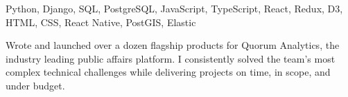 \documentclass[]{article}
\def\Plus{\texttt{+}}
\begin{document}
Python, Django, SQL, PostgreSQL, JavaScript, TypeScript, React, Redux, D3, HTML, CSS, React Native, PostGIS, Elastic


\vspace{5pt}


Wrote and launched over a dozen flagship products for Quorum Analytics, the industry leading public affairs platform. I consistently solved the team's most complex technical challenges while delivering projects on time, in scope, and under budget.
\end{document}

